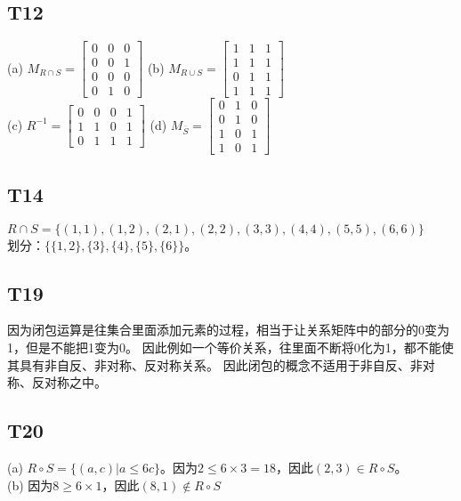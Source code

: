 \documentclass{article}
\begin{document}
\subsection{T12}
(a) $M_{R\cap S} = 
\begin{bmatrix}
    0 & 0 & 0\\
    0 & 0 & 1\\
    0 & 0 & 0\\
    0 & 1 & 0
\end{bmatrix}$\quad
(b) $M_{R \cup S} = 
\begin{bmatrix}
    1 & 1 & 1\\
    1 & 1 & 1\\
    0 & 1 & 1\\
    1 & 1 & 1
\end{bmatrix}$\\
(c) $R^{-1} = 
\begin{bmatrix}
    0 & 0 & 0 & 1\\
    1 & 1 & 0 & 1\\
    0 & 1 & 1 & 1
\end{bmatrix}$\quad
(d) $M_{\overline{S}} = 
\begin{bmatrix}
    0 & 1 & 0\\
    0 & 1 & 0\\
    1 & 0 & 1\\
    1 & 0 & 1
\end{bmatrix}$
\subsection{T14}
$R\cap S = \{(1, 1), (1, 2), (2, 1), (2, 2), (3, 3), (4, 4), (5, 5), (6, 6)\}$\\
划分：$\{\{1, 2\}, \{3\}, \{4\}, \{5\}, \{6\}\}$。
\subsection{T19}
因为闭包运算是往集合里面添加元素的过程，相当于让关系矩阵中的部分的0变为1，但是不能把1变为0。
因此例如一个等价关系，往里面不断将0化为1，都不能使其具有非自反、非对称、反对称关系。
因此闭包的概念不适用于非自反、非对称、反对称之中。
\subsection{T20}
(a) $R \circ S = \{(a, c) | a \leq 6c\}$。因为$2 \leq 6 \times 3 = 18$，因此$(2, 3) \in R \circ S$。\\
(b) 因为$8 \geq 6 \times 1$，因此$(8, 1) \notin R \circ S$
\end{document}
